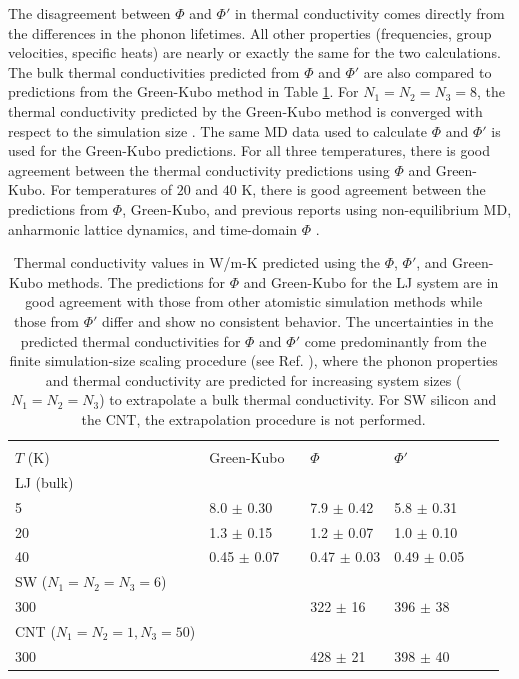 The disagreement between $\Phi$ and $\Phi'$ in thermal conductivity comes 
directly from the differences 
in the phonon lifetimes. All other properties (frequencies, group 
velocities, specific heats) are 
nearly or exactly the same for the two calculations. The bulk thermal 
conductivities predicted from 
$\Phi$ and $\Phi'$ are also compared to predictions from the Green-Kubo 
method\cite{mcquarrie_statistical_2000} in 
Table \ref{T:cond_table}. For $N_1=N_2=N_3=8$, the thermal conductivity 
predicted by the Green-Kubo 
method is converged with respect to the simulation size 
\cite{mcgaughey_quantitative_2004}. The same MD data used 
to calculate $\Phi$ and $\Phi'$ is used for the Green-Kubo predictions. For 
all three temperatures, 
there is good agreement between the thermal conductivity predictions using 
$\Phi$ and Green-Kubo. For 
temperatures of $20$ and $40$ K, there is good agreement between the 
predictions from $\Phi$, Green-Kubo, 
and previous reports using non-equilibrium MD, anharmonic lattice dynamics, 
and time-domain $\Phi$ 
\cite{turney_predicting_2009}.
\begin{center}
\begin{table}
\caption{\label{T:cond_table}Thermal conductivity values in W/m-K predicted 
using the $\Phi$, 
$\Phi'$, and Green-Kubo methods.  The predictions for $\Phi$ and Green-Kubo 
for the LJ system 
are in good agreement with those from other atomistic simulation methods
\cite{turney_predicting_2009} while 
those from $\Phi'$ differ and show no consistent behavior. The 
uncertainties in the predicted thermal 
conductivities for $\Phi$ and $\Phi'$ come predominantly from the finite 
simulation-size scaling 
procedure (see Ref. \cite{turney_predicting_2009,he_thermal_2011}), 
where the phonon 
properties and thermal conductivity 
are predicted for increasing system sizes ($N_1=N_2=N_3$) to extrapolate 
a bulk thermal conductivity. 
For SW silicon and the CNT, the extrapolation procedure is not performed. }
\begin{ruledtabular}
\begin{tabular}{llllll}
     &                             &         &      &   \\
$T$ (K)&Green-Kubo \ &$\Phi$ &$\Phi'$\\
\hline
LJ (bulk)\\
5&8.0 $\pm$ 0.30 &7.9 $\pm$ 0.42 &5.8 $\pm$ 0.31 \\
20&1.3 $\pm$ 0.15 &1.2 $\pm$ 0.07 &1.0 $\pm$ 0.10 \\
40&0.45 $\pm$ 0.07 &0.47 $\pm$ 0.03 &0.49 $\pm$ 0.05 \\
\hline
SW ($N_1=N_2=N_3=6$) \\
300& &322 $\pm$ 16 &396 $\pm$ 38 \\
\hline
CNT ($N_1=N_2=1, N_3=50$) \\
300& &428 $\pm$ 21 &398 $\pm$ 40 \\
\end{tabular}
\end{ruledtabular}
\end{table}
\end{center}
